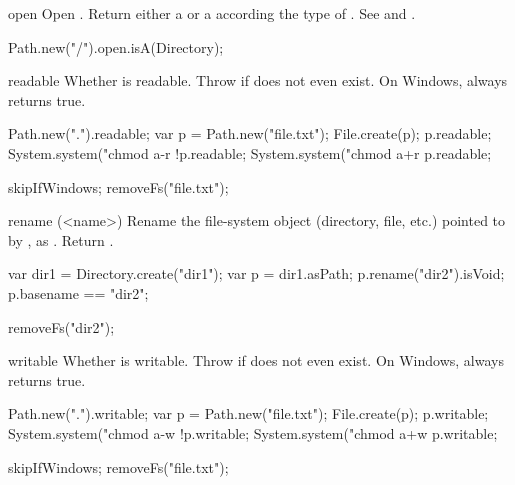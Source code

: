 \begin{urbiscriptapi}
\item[open] Open \this. Return either a  or a 
  according the type of \this. See  and
  .
\begin{urbiassert}
Path.new("/").open.isA(Directory);
\end{urbiassert}


\item[readable]
  Whether \this is readable.  Throw if does not even exist.  On Windows,
  always returns true.
\begin{urbiassert}[firstnumber=1]
Path.new(".").readable;
var p = Path.new("file.txt");
File.create(p);
p.readable;
System.system("chmod a-r %
!p.readable;
System.system("chmod a+r %
p.readable;
\end{urbiassert}
\begin{urbicomment}
skipIfWindows;
removeFs("file.txt");
\end{urbicomment}


\item[rename](<name>)%
  Rename the file-system object (directory, file, etc.) pointed to by \this,
  as .  Return .
\begin{urbiassert}[firstnumber=1]
var dir1 = Directory.create("dir1");
var p = dir1.asPath;
p.rename("dir2").isVoid;
p.basename == "dir2";
\end{urbiassert}
\begin{urbicomment}
removeFs("dir2");
\end{urbicomment}


\item[writable]%
  Whether \this is writable.  Throw if does not even exist.  On Windows,
  always returns true.
\begin{urbiassert}[firstnumber=1]
Path.new(".").writable;
var p = Path.new("file.txt");
File.create(p);
p.writable;
System.system("chmod a-w %
!p.writable;
System.system("chmod a+w %
p.writable;
\end{urbiassert}
\begin{urbicomment}
skipIfWindows;
removeFs("file.txt");
\end{urbicomment}
\end{urbiscriptapi}


